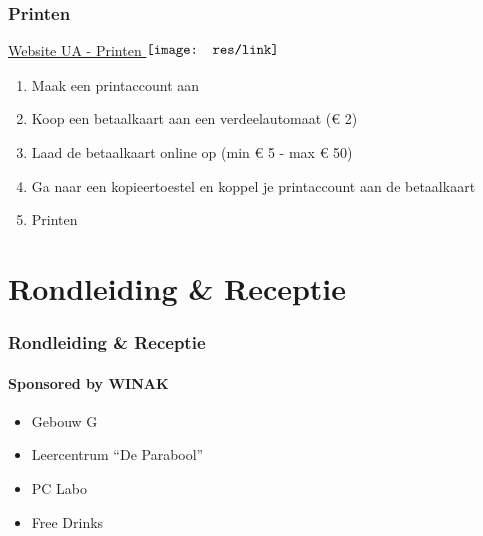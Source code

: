 	\begin{frame}[allowframebreaks=10]
		\frametitle{Printen}
        \href{https://www.uantwerpen.be/nl/bibliotheek/diensten/faciliteiten/ter-plaatse/printen-kopieren-scannen/}{Website UA - Printen $\vcenter{\hbox{\texttt{[image: res/link]}}\vspace{0.1cm}}$} \vspace{1cm}
        \begin{enumerate}
        	\item Maak een printaccount aan
            \item Koop een betaalkaart aan een verdeelautomaat (€ 2)
            \item Laad de betaalkaart online op (min € 5 - max € 50)
            \item  Ga naar een kopieertoestel en koppel je printaccount aan de betaalkaart
            \item Printen
        \end{enumerate}
	\end{frame}
    
    \section{Rondleiding \& Receptie}
	\begin{frame}
		\frametitle{Rondleiding \& Receptie}
		\framesubtitle{Sponsored by WINAK}
        \begin{itemize}
        	\item Gebouw G
            \item Leercentrum ``De Parabool''
            \item PC Labo
            \item Free Drinks
		\end{itemize}
	\end{frame}
